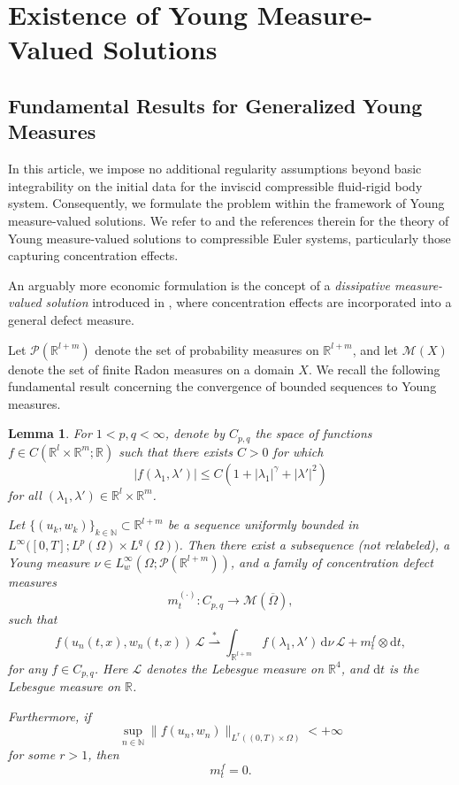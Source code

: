 \documentclass[11pt,twoside,reqno]{amsart}
\numberwithin{equation}{section}
\numberwithin{figure}{section}
\newtheorem{lemma}{Lemma}[section]
\begin{document}
\section{Existence of Young Measure-Valued Solutions}
\subsection{Fundamental Results for Generalized Young Measures}

In this article, we impose no additional regularity assumptions beyond basic integrability on the initial data for the inviscid compressible fluid-rigid body system. Consequently, we formulate the problem within the framework of Young measure-valued solutions. We refer to \cite{gwiazda2015weak} and the references therein for the theory of Young measure-valued solutions to compressible Euler systems, particularly those capturing concentration effects. 

An arguably more economic formulation is the concept of a \emph{dissipative measure-valued solution} introduced in \cite{MR3567640}, where concentration effects are incorporated into a general defect measure.

Let $\mathcal{P}(\mathbb{R}^{l+m})$ denote the set of probability measures on $\mathbb{R}^{l+m}$, and let $\mathcal{M}(X)$ denote the set of finite Radon measures on a domain $X$. We recall the following fundamental result concerning the convergence of bounded sequences to Young measures.

\begin{lemma}\label{lemma:YoungMeasure1}
For $1<p,q<\infty$, denote by $C_{p,q}$ the space of functions $f\in C(\mathbb{R}^l \times \mathbb{R}^m; \mathbb{R})$ such that there exists $C>0$ for which
\begin{equation*}
|f(\lambda_1,\lambda')|\leq C(1+|\lambda_1|^\gamma+|\lambda'|^2)    
\end{equation*}
for all $(\lambda_1,\lambda')\in \mathbb{R}^l \times \mathbb{R}^m$.

Let $\{(u_k, w_k)\}_{k\in\mathbb{N}} \subset \mathbb{R}^{l+m}$ be a sequence uniformly bounded in $L^{\infty}\big([0,T]; L^p(\Omega)\times L^q(\Omega)\big)$. Then there exist a subsequence (not relabeled), a Young measure $\nu \in L^{\infty}_w(\Omega; \mathcal{P}(\mathbb{R}^{l+m}))$, and a family of concentration defect measures
\[
m_t^{(\cdot)}: C_{p,q} \longrightarrow \mathcal{M}(\overline{\Omega}),
\]
such that 
\begin{equation}\label{eq:YoungmeasureConvergence}
    f(u_n(t,x), w_n(t,x))\,\mathcal{L} \overset{*}{\rightharpoonup}
    \int_{\mathbb{R}^{l+m}} f(\lambda_1, \lambda')\,\mathrm{d}\nu\,\mathcal{L}
    + m^f_t \otimes \mathrm{d}t,
\end{equation}
for any $f \in C_{p,q}$. 
Here $\mathcal{L}$ denotes the Lebesgue measure on $\mathbb{R}^4$, and $\mathrm{d}t$ is the Lebesgue measure on $\mathbb{R}$.

Furthermore, if 
\[
\sup_{n\in\mathbb{N}} \| f(u_n, w_n) \|_{L^{r}((0,T)\times\Omega)} < +\infty
\]
for some $r > 1$, then
\begin{equation}
    m^f_t = 0.
\end{equation}
\end{lemma}
\end{document}
